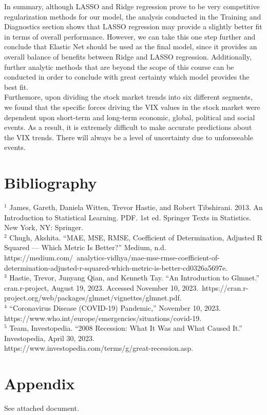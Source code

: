 \documentclass{article}
\begin{document}
In summary, although LASSO and Ridge regression prove to be very competitive regularization methods for our model, the analysis conducted in the Training and Diagnostics section shows that LASSO regression may provide a slightly better fit in terms of overall performance. However, we can take this one step further and conclude that Elastic Net should be used as the final model, since it provides an overall balance of benefits between Ridge and LASSO regression. Additionally, further analytic methods that are beyond the scope of this course can be conducted in order to conclude with great certainty which model provides the best fit.\\

Furthemore, upon dividing the stock market trends into six different segments, we found that the specific forces driving the VIX values in the stock market were dependent upon short-term and long-term economic, global, political and social events. As a result, it is extremely difficult to make accurate predictions about the VIX trends. There will always be a level of uncertainty due to unforseeable events.

\section{Bibliography}
$^1$ James, Gareth, Daniela Witten, Trevor Hastie, and Robert Tibshirani. 2013. An Introduction to Statistical Learning. PDF. 1st ed. Springer Texts in Statistics. New York, NY: Springer.\\

\noindent $^2$ Chugh, Akshita. “MAE, MSE, RMSE, Coefficient of Determination, Adjusted R Squared — Which Metric Is Better?” Medium, n.d. https://medium.com/\ analytics-vidhya/mae-mse-rmse-coefficient-of-determination-adjusted-r-squared-which-metric-is-better-cd0326a5697e.\\

\noindent $^3$ Hastie, Trevor, Junyang Qian, and Kenneth Tay. “An Introduction to Glmnet.” cran.r-project, August 19, 2023. Accessed November 10, 2023.\ https://cran.r-project.org/web/packages/glmnet/vignettes/glmnet.pdf.\\

\noindent $^4$ “Coronavirus Disease (COVID-19) Pandemic,” November 10, 2023.\\ https://www.who.int/europe/emergencies/situations/covid-19.\\

\noindent $^5$ Team, Investopedia. “2008 Recession: What It Was and What Caused It.” Investopedia, April 30, 2023. \\ https://www.investopedia.com/terms/g/great-recession.asp.

\section{Appendix}
See attached document.
\end{document}
